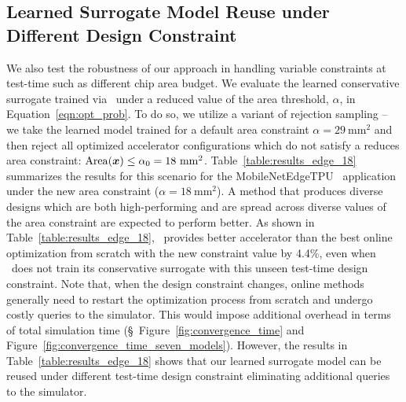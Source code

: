 \subsection{Learned Surrogate Model Reuse under Different Design Constraint}
\label{app:transfer}
%
We also test the robustness of our approach in handling variable constraints at test-time such as different chip area budget.
%
We evaluate the learned conservative surrogate trained via \primemethodname\ under a reduced value of the area threshold, $\alpha$, in Equation~\ref{eqn:opt_prob}.
%
To do so, we utilize a variant of rejection sampling -- we take the learned model trained for a default area constraint $\alpha = 29~\mathrm{mm}^2$ and then reject all optimized accelerator configurations which do not satisfy a reduces area constraint: $\mathrm{Area}({\boldsymbol{x}}) \leq \alpha_0 = 18~\mathrm{mm}^2$.
%
Table~\ref{table:results_edge_18} summarizes the results for this scenario for the MobileNetEdgeTPU~\citep{edgetpu:arxiv:2020} application under the new area constraint ($\alpha = 18~\mathrm{mm}^2$).
%
A method that produces diverse designs which are both high-performing and are spread across diverse values of the area constraint are expected to perform better.
%
As shown in Table~\ref{table:results_edge_18}, \primemethodname\ provides better accelerator than the best online optimization from scratch with the new constraint value by 4.4\%, even when \primemethodname\ does not train its conservative surrogate with this unseen test-time design constraint.
%
Note that, when the design constraint changes, online methods generally need to restart the optimization process from scratch and undergo costly queries to the simulator.
%
This would impose additional overhead in terms of total simulation time (\S~Figure~\ref{fig:convergence_time} and Figure~\ref{fig:convergence_time_seven_models}). However, the results in Table~\ref{table:results_edge_18} shows that our learned surrogate model can be reused under different test-time design constraint eliminating additional queries to the simulator.
%
